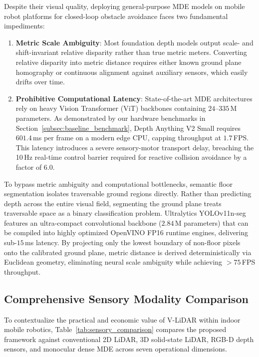\documentclass{ieeeaccess}
\begin{document}
Despite their visual quality, deploying general-purpose MDE models on mobile robot platforms for closed-loop obstacle avoidance faces two fundamental impediments:
\begin{enumerate}
  \item \textbf{Metric Scale Ambiguity}: Most foundation depth models output scale- and shift-invariant relative disparity rather than true metric meters. Converting relative disparity into metric distance requires either known ground plane homography or continuous alignment against auxiliary sensors, which easily drifts over time.
  \item \textbf{Prohibitive Computational Latency}: State-of-the-art MDE architectures rely on heavy Vision Transformer (ViT) backbones containing $24\text{--}335$\,M parameters. As demonstrated by our hardware benchmarks in Section~\ref{subsec:baseline_benchmark}, Depth Anything V2 Small requires $601.4$\,ms per frame on a modern edge CPU, capping throughput at $1.7$\,FPS. This latency introduces a severe sensory-motor transport delay, breaching the 10\,Hz real-time control barrier required for reactive collision avoidance by a factor of 6.0.
\end{enumerate}

To bypass metric ambiguity and computational bottlenecks, semantic floor segmentation isolates traversable ground regions directly. Rather than predicting depth across the entire visual field, segmenting the ground plane treats traversable space as a binary classification problem. Ultralytics YOLOv11n-seg~\cite{ultralytics_2024_ultralytics} features an ultra-compact convolutional backbone ($2.84$\,M parameters) that can be compiled into highly optimized OpenVINO FP16 runtime engines, delivering sub-$15$\,ms latency. By projecting only the lowest boundary of non-floor pixels onto the calibrated ground plane, metric distance is derived deterministically via Euclidean geometry, eliminating neural scale ambiguity while achieving $>75$\,FPS throughput.

\subsection{Comprehensive Sensory Modality Comparison}
\label{subsec:sensory_comparison}

To contextualize the practical and economic value of V-LiDAR within indoor mobile robotics, Table~\ref{tab:sensory_comparison} compares the proposed framework against conventional 2D LiDAR, 3D solid-state LiDAR, RGB-D depth sensors, and monocular dense MDE across seven operational dimensions.
\end{document}

